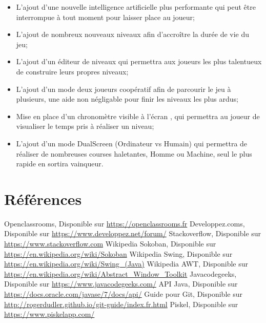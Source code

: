 \documentclass[a4paper,12pt]{article} %
\begin{document}
\begin{itemize}
\item L'ajout d'une nouvelle intelligence artificielle plus performante qui peut être interrompue à tout moment pour laisser place au joueur;
\item L'ajout de nombreux nouveaux niveaux afin d'accroître la durée de vie du jeu;
\item L'ajout d'un éditeur de niveaux qui permettra aux joueurs les plus talentueux de construire leurs propres niveaux;
\item L'ajout d'un mode deux joueurs coopératif afin de parcourir le jeu à plusieurs, une aide non négligable pour finir les niveaux les plus ardus;
\item Mise en place d'un chronomètre visible à l'écran , qui permettra au joueur de visualiser le temps pris à réaliser un niveau;
\item L'ajout d'un mode DualScreen (Ordinateur vs Humain) qui permettra de réaliser de nombreuses courses haletantes, Homme ou Machine, seul le plus rapide en sortira vainqueur.
\end{itemize}

\newpage

\section{Références}

\begin{thebibliography}{9}
 Openclassrooms, Disponible sur \url{https://openclassrooms.fr}
 Developpez.coms, Disponible sur \url{https://www.developpez.net/forum/}
 Stackoverflow, Disponible sur \url{https://www.stackoverflow.com}
 Wikipedia Sokoban, Disponible sur \url{ https://en.wikipedia.org/wiki/Sokoban}
 Wikipedia Swing, Disponible sur \url{ https://en.wikipedia.org/wiki/Swing_(Java)}
 Wikipedia AWT, Disponible sur \url{ https://en.wikipedia.org/wiki/Abstract_Window_Toolkit}
 Javacodegeeks, Disponible sur \url{https://www.javacodegeeks.com/}
 API Java, Disponible sur \url{https://docs.oracle.com/javase/7/docs/api/}
 Guide pour Git, Disponible sur \url{http://rogerdudler.github.io/git-guide/index.fr.html}
 Piskel, Disponible sur \url{https://www.piskelapp.com/}

\end{thebibliography}
\end{document}

